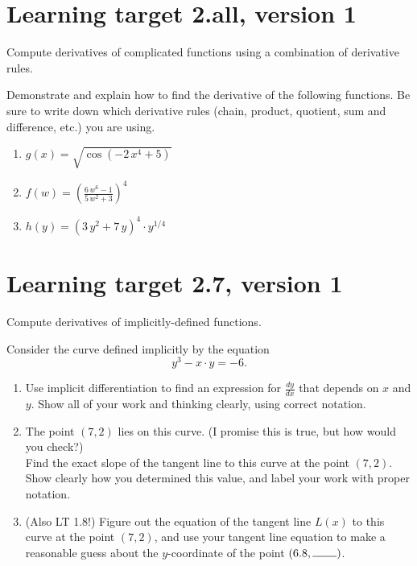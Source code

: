 \pagebreak

\section{Learning target 2.all, version 1}

Compute derivatives of complicated functions using a combination of derivative rules.

\hrulefill

Demonstrate and explain how to find the derivative of the following functions. Be sure to write down which derivative rules (chain, product, quotient, sum and difference, etc.) you are using.

\begin{enumerate}
    \item \(g(x) = \sqrt{\cos\left(-2 \, x^{4} + 5\right)}\)
    \vfill
    \item \(f(w) = \left( \frac{6 \, w^{6} - 1}{5 \, w^2 + 3} \right)^{ 4 }\)
    \vfill
    \item \(h(y) = {\left(3 \, y^{2} + 7 \, y\right)}^{4}\cdot y^{1/4}\)
    \vfill
\end{enumerate}

\pagebreak

\section{Learning target 2.7, version 1}

Compute derivatives of implicitly-defined functions.

\hrulefill

Consider the curve defined implicitly by the equation
\[y^3-x\cdot y = -6.\]
	
\begin{enumerate}[leftmargin=15pt]

	\item Use implicit differentiation to find an expression for $\frac{dy}{dx}$ that depends on $x$ and $y$.  Show all of your work and thinking clearly, using correct notation.

	\vfill

	\item The point $(7,2)$ lies on this curve. (I promise this is true, but how would you check?) \\
	Find the exact slope of the tangent line to this curve at the point \((7,2)\). Show clearly how you determined this value, and label your work with proper notation.

	\vspace{1.25in}

	
	\item (Also LT 1.8!) Figure out the equation of the tangent line $L(x)$ to this curve at the point $(7,2)$, and use your tangent line equation to make a reasonable guess about the $y$-coordinate of the point $(6.8, \rule{0.75cm}{0.15mm} )$.
	\vfill

\end{enumerate}

